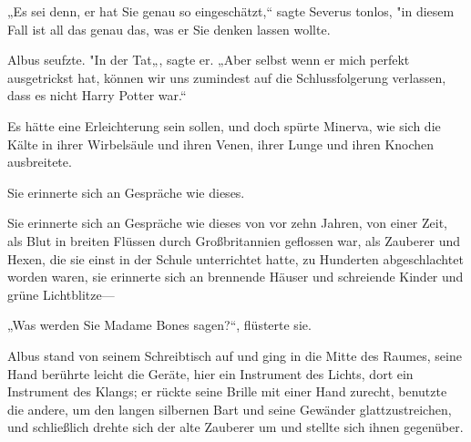 „Es sei denn, er hat Sie genau so eingeschätzt,“ sagte Severus tonlos, "in diesem Fall ist all das genau das, was er Sie denken lassen wollte.

Albus seufzte. "In der Tat„, sagte er. „Aber selbst wenn er mich perfekt ausgetrickst hat, können wir uns zumindest auf die Schlussfolgerung verlassen, dass es nicht Harry Potter war.“

Es hätte eine Erleichterung sein sollen, und doch spürte Minerva, wie sich die Kälte in ihrer Wirbelsäule und ihren Venen, ihrer Lunge und ihren Knochen ausbreitete.

Sie erinnerte sich an Gespräche wie dieses.

Sie erinnerte sich an Gespräche wie dieses von vor zehn Jahren, von einer Zeit, als Blut in breiten Flüssen durch Großbritannien geflossen war, als Zauberer und Hexen, die sie einst in der Schule unterrichtet hatte, zu Hunderten abgeschlachtet worden waren, sie erinnerte sich an brennende Häuser und schreiende Kinder und grüne Lichtblitze—

„Was werden Sie Madame Bones sagen?“, flüsterte sie.

Albus stand von seinem Schreibtisch auf und ging in die Mitte des Raumes, seine Hand berührte leicht die Geräte, hier ein Instrument des Lichts, dort ein Instrument des Klangs; er rückte seine Brille mit einer Hand zurecht, benutzte die andere, um den langen silbernen Bart und seine Gewänder glattzustreichen, und schließlich drehte sich der alte Zauberer um und stellte sich ihnen gegenüber.

